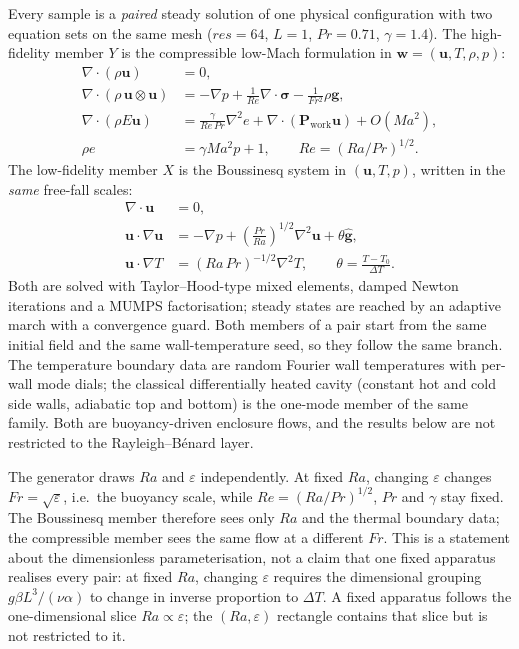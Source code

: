 \documentclass[preprint,11pt,a4paper,times,doubleblind]{elsarticle}
\begin{document}
Every sample is a \emph{paired} steady solution of one physical configuration with two equation sets
on the same mesh ($res=64$, $L=1$, $Pr=0.71$, $\gamma=1.4$). The high-fidelity member $Y$ is the
compressible low-Mach formulation in $\bm w=(\bm u,T,\rho,p)$:
\begin{align}
\nabla\cdot(\rho\bm u)&=0,\label{eq:cmass}\\
\nabla\cdot(\rho\,\bm u\otimes\bm u)&=-\nabla p+\frac{1}{Re}\nabla\cdot\bm\sigma-\frac{1}{Fr^2}\rho\bm g,\label{eq:cmom}\\
\nabla\cdot(\rho E\bm u)&=\frac{\gamma}{Re\,Pr}\nabla^2e+\nabla\cdot(\bm P_{\mathrm{work}}\bm u)+O(Ma^2),\label{eq:cenergy}\\
\rho e&=\gamma Ma^2p+1,\qquad Re=(Ra/Pr)^{1/2}.\label{eq:ceos}
\end{align}
The low-fidelity member $X$ is the Boussinesq system in $(\bm u,T,p)$, written in the \emph{same}
free-fall scales:
\begin{align}
\nabla\cdot\bm u&=0,\label{eq:bmass}\\
\bm u\cdot\nabla\bm u&=-\nabla p+\left(\frac{Pr}{Ra}\right)^{1/2}\nabla^2\bm u+\theta\hat{\bm g},\label{eq:bmom}\\
\bm u\cdot\nabla T&=(Ra\,Pr)^{-1/2}\nabla^2T,\qquad \theta=\frac{T-T_0}{\Delta T}.\label{eq:benergy}
\end{align}
Both are solved with Taylor--Hood-type mixed elements, damped Newton iterations and a MUMPS
factorisation; steady states are reached by an adaptive march with a convergence guard. Both
members of a pair start from the same initial field and the same wall-temperature seed, so they
follow the same branch. The
temperature boundary data are random Fourier wall temperatures with per-wall mode dials; the
classical differentially heated cavity (constant hot and cold side walls, adiabatic top and
bottom) is the one-mode member of the same family. Both are buoyancy-driven enclosure flows, and
the results below are not restricted to the Rayleigh--B\'enard layer.

The generator draws $Ra$ and $\varepsilon$ independently. At fixed $Ra$, changing $\varepsilon$
changes $Fr=\sqrt{\varepsilon}$, i.e.\ the buoyancy scale, while $Re=(Ra/Pr)^{1/2}$, $Pr$ and
$\gamma$ stay fixed. The Boussinesq member therefore sees only $Ra$ and the thermal boundary data;
the compressible member sees the same flow at a different $Fr$. This is a statement about the
dimensionless parameterisation, not a claim that one fixed apparatus realises every pair: at fixed
$Ra$, changing $\varepsilon$ requires the dimensional grouping $g\beta L^3/(\nu\alpha)$ to change in
inverse proportion to $\Delta T$. A fixed apparatus follows the one-dimensional slice
$Ra\propto\varepsilon$; the $(Ra,\varepsilon)$ rectangle contains that slice but is not restricted
to it.
\end{document}
